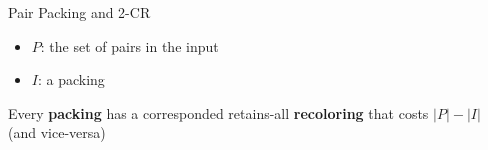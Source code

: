 \begin{frame}{Pair Packing and 2-CR}

\begin{itemize}
\boldmath
\item 
$P$: the set of pairs in the input

\pause\item
$I$: a packing


\end{itemize}
\pause 
\begin{observation}
Every \textbf{packing} has a corresponded retains-all \textbf{recoloring} that costs 
$|P| - |I|$ (and vice-versa)
\end{observation}

\end{frame}
